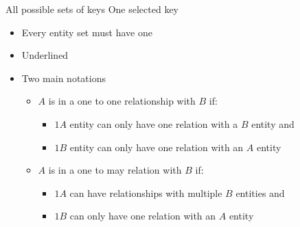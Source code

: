 \begin{itemize}
\begin{itemize}
\begin{itemize}
                     All possible sets of keys
                     One selected key
                        \begin{itemize}
                            \item Every entity set must have one
                            \item Underlined
                        \end{itemize}
                \end{itemize}
        \end{itemize}
        \begin{itemize}
            \item Two main notations
                \begin{itemize}
                        \begin{itemize}
                            \item $A$ is in a one to one relationship with $B$ if:
                                \begin{itemize}
                                    \item $1 A$ entity can only have one relation with a $B$ entity and
                                    \item $1 B$ entity can only have one relation with an $A$ entity
                                \end{itemize}
                        \end{itemize}
                        \begin{itemize}
                            \item $A$ is in a one to may relation with $B$ if:
                                \begin{itemize}
                                    \item $1 A$ can have relationships with multiple $B$ entities and
                                    \item $1 B$ can only have one relation with an $A$ entity
                                \end{itemize}
                        \end{itemize}
                        \begin{itemize}

\end{itemize}
\end{itemize}
\end{itemize}
\end{itemize}

